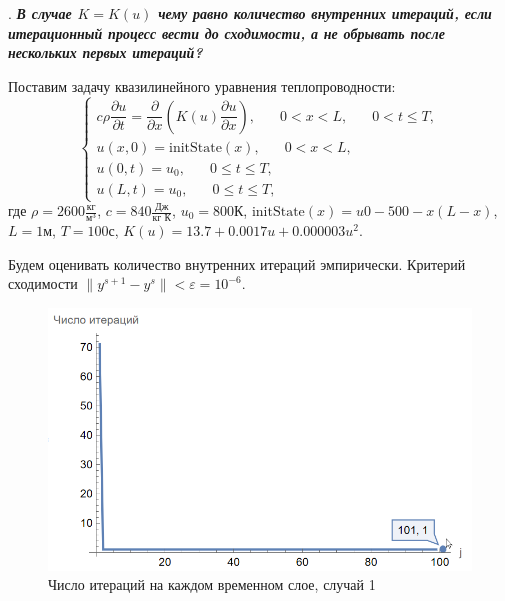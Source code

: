 \documentclass[12pt, a4paper]{article}
\newcounter{mycounter}
\newcommand{\quastion}[1]{%
	\stepcounter{mycounter}%
	\textbf{\themycounter}.  %
	\textbf{\textit{#1}}
	
}
\begin{document}
	
	\clearpage %
	\quastion{В случае $K = K(u)$ чему равно количество внутренних итераций, если итерационный процесс вести до сходимости, а не обрывать после нескольких первых итераций?}
	
	Поставим задачу квазилинейного уравнения теплопроводности:
	\[
	\begin{cases}
		c \rho \dfrac{\partial u}{\partial t} = \dfrac{\partial}{\partial x}\left(K(u)\dfrac{\partial u}{\partial x} \right), \phantom{xxx} 0<x<L, \phantom{xxx} 0<t\le T, \\
		u(x,0) = \text{initState}(x), \phantom{xxx} 0<x<L,\\
		u(0,t) = u_0, \phantom{xxx} 0 \le t \le T,\\
		u(L, t) = u_0, \phantom{xxx} 0 \le t \le T,
	\end{cases}
	\]
	где $\rho = 2600\frac{\text{кг}}{\text{м}^3}$, $c = 840 \frac{\text{Дж}}{\text{кг К}}$, $u_0 = 800$К, $\text{initState}(x)=u0-500 - x(L-x)$, $L=1$м, $T=100$с, $K(u)=13.7+0.0017u+0.000003u^2$.
	
	Будем оценивать количество внутренних итераций эмпирически. Критерий сходимости $\|y^{s+1}-y^{s}\| < \varepsilon = 10^{-6}$.
	
	 \begin{figure}[H]
		\centering
		\includegraphics[width=1\textwidth]{iterations1}
		\caption{Число итераций на каждом временном слое, случай 1}
	\end{figure}
\end{document}

